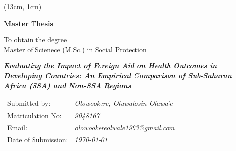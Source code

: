 \begin{titlepage}



    \begin{textblock*}{6cm}(13cm, 1cm) %
    \raggedright
        {}
   \end{textblock*}


   

\vspace*{3cm}
\centering
{\fontsize{20}{12} \textbf{Master Thesis}}

\vspace*{1.5cm}

    {\fontsize{16}{12}To obtain the degree \\
Master of Scienece (M.Sc.) in Social Protection}


\vspace*{4cm}

\begin{onehalfspace}
{\fontsize{15}{12} \textbf{ \textit{Evaluating the Impact of Foreign Aid on Health Outcomes in Developing Countries: An Empirical Comparison of Sub-Saharan Africa (SSA) and Non-SSA Regions}}}
    
\end{onehalfspace}

\vspace*{3cm}

{\flushleft
\begin{tabular}{l l}

Submitted by:     & \quad \textit{Olowookere, Oluwatosin Olawale} \\
  Matriculation No:   & \quad \textit{9048167} \\
  Email: & \quad  \href{mailto:Olowookere Oluwatosin}{\textit{olowookereolwale1993@gmail.com}}\\
Date of Submission: & \quad  \textit{\today}\\
  

\end{tabular}}
\end{titlepage}
